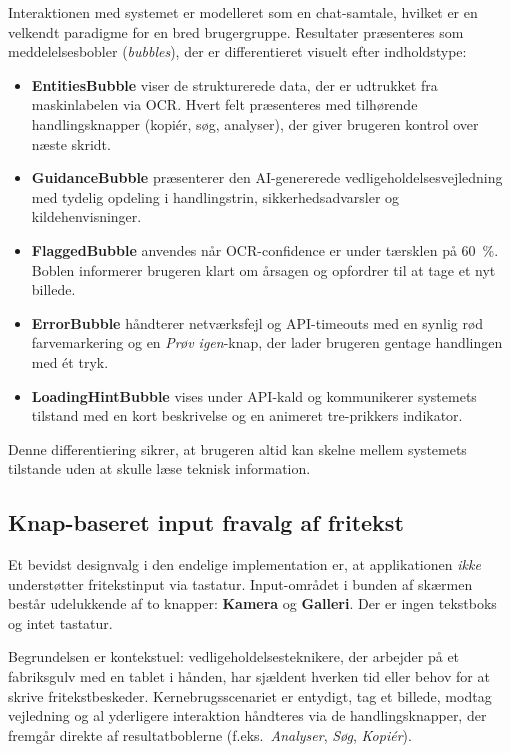 Interaktionen med systemet er modelleret som en chat-samtale, hvilket er en velkendt paradigme for en bred brugergruppe. Resultater præsenteres som meddelelsesbob\-ler (\textit{bubbles}), der er differentieret visuelt efter indholdstype:

\begin{itemize}
  \item \textbf{EntitiesBubble} viser de strukturerede data, der er udtrukket fra maskinlabelen via OCR. Hvert felt præsenteres med tilhørende handlingsknapper (kopiér, søg, analyser), der giver brugeren kontrol over næste skridt.
  \item \textbf{GuidanceBubble} præsenterer den AI-genererede vedligeholdelsesvejledning med tydelig opdeling i handlingstrin, sikkerhedsadvarsler og kildehenvisninger.
  \item \textbf{FlaggedBubble} anvendes når OCR-confidence er under tærsklen på 60~\%. Boblen informerer brugeren klart om årsagen og opfordrer til at tage et nyt billede.
  \item \textbf{ErrorBubble} håndterer netværksfejl og API-timeouts med en synlig rød farvemarkering og en \textit{Prøv igen}-knap, der lader brugeren gentage handlingen med ét tryk.
  \item \textbf{LoadingHintBubble} vises under API-kald og kommunikerer systemets tilstand med en kort beskrivelse og en animeret tre-prikkers indikator.
\end{itemize}

Denne differentiering sikrer, at brugeren altid kan skelne mellem systemets tilstande uden at skulle læse teknisk information.

\subsection{Knap-baseret input fravalg af fritekst}
\label{sec:inputmodel}

Et bevidst designvalg i den endelige implementation er, at applikationen \emph{ikke} understøtter fritekstinput via tastatur. Input-området i bunden af skærmen består udelukkende af to knapper: \textbf{Kamera} og \textbf{Galleri}. Der er ingen tekstboks og intet tastatur.

Begrundelsen er kontekstuel: vedligeholdelsesteknikere, der arbejder på et fabriksgulv med en tablet i hånden, har sjældent hverken tid eller behov for at skrive fritekstbeskeder. Kernebrugsscenariet er entydigt, tag et billede, modtag vejledning og al yderligere interaktion håndteres via de handlingsknapper, der fremgår direkte af resultatboblerne (f.eks.\ \textit{Analyser}, \textit{Søg}, \textit{Kopiér}).

